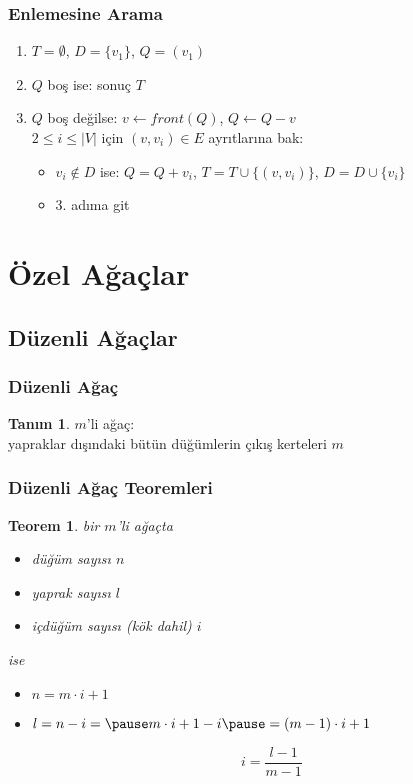 \documentclass[dvipsnames]{beamer}
\theoremstyle{definition}
\newtheorem{tanim}[theorem]{Tanım}
\theoremstyle{example}
\theoremstyle{plain}
\newtheorem{teorem}[theorem]{Teorem}
\begin{document}
\begin{frame}
  \frametitle{Enlemesine Arama}

  \begin{enumerate}
    \item $T=\emptyset$, $D=\{v_1\}$, $Q=(v_1)$

    \pause
    \item $Q$ boş ise: sonuç $T$
    \item $Q$ boş değilse: $v \leftarrow front(Q)$, $Q \leftarrow Q - v$\\
      $2 \leq i \leq |V|$ için $(v,v_i) \in E$ ayrıtlarına bak:
    \begin{itemize}
      \item $v_i \notin D$ ise: $Q = Q + v_i$, $T = T \cup \{(v,v_i)\}$,
        $D=D \cup \{v_i\}$
       \item 3. adıma git
    \end{itemize}
  \end{enumerate}
\end{frame}

\section{Özel Ağaçlar}

\subsection{Düzenli Ağaçlar}

\begin{frame}
  \frametitle{Düzenli Ağaç}

  \begin{tanim}
    \alert{$m$'li ağaç}:\\
    yapraklar dışındaki bütün düğümlerin çıkış kerteleri $m$
  \end{tanim}
\end{frame}

\begin{frame}
  \frametitle{Düzenli Ağaç Teoremleri}

  \begin{teorem}
    bir $m$'li ağaçta

    \begin{itemize}
      \item düğüm sayısı $n$
      \item yaprak sayısı $l$
      \item içdüğüm sayısı (kök dahil) $i$
    \end{itemize}

    ise

    \begin{itemize}
      \item $n = m \cdot i + 1$

      \pause
      \item  $l = n - i = \pause m \cdot i + 1 - i
        \pause = (m - 1) \cdot i + 1$

      \pause
      \[
        i = \frac{l - 1}{m - 1}
      \]
    \end{itemize}
  \end{teorem}
\end{frame}
\end{document}
